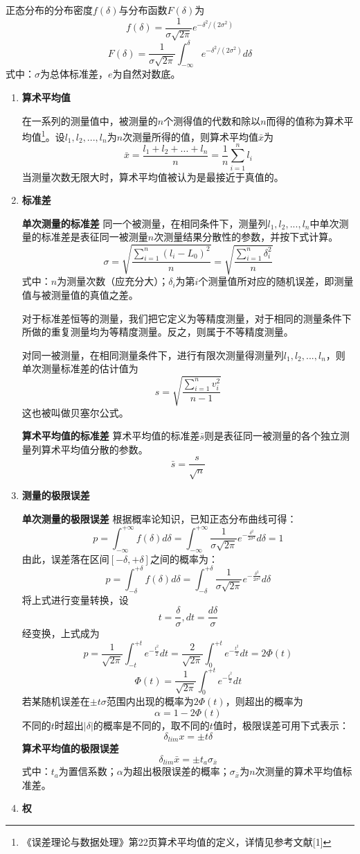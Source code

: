 正态分布的分布密度$ f(\delta) $与分布函数$ F(\delta) $为\[ f(\delta)=\frac{1}{\sigma\sqrt{2\pi}}e^{-\delta^2/(2\sigma^2)} \]\[ F(\delta)=\frac{1}{\sigma\sqrt{2\pi}}\int_{-\infty}^{\delta}e^{-\delta^2/(2\sigma^2)}d\delta \]
式中：$ \sigma $为总体标准差，$ e $为自然对数底。
\begin{enumerate}
	\item \textbf{算术平均值}
	
	\qquad 在一系列的测量值中，被测量的$ n $个测得值的代数和除以$ n $而得的值称为算术平均值\footnote{《误差理论与数据处理》第22页算术平均值的定义，详情见参考文献[1]}。设$ l_1,l_2,...,l_n $为$ n $次测量所得的值，则算术平均值$ \bar{x} $为\[ \bar{x}=\frac{l_1+l_2+...+l_n}{n}=\frac{1}{n}\sum_{i=1}^{n}l_i \]
	当测量次数无限大时，算术平均值被认为是最接近于真值的。
	\item \textbf{标准差}
	
	\textbf{单次测量的标准差 } 同一个被测量，在相同条件下，测量列$ l_1,l_2,...,l_n $中单次测量的标准差是表征同一被测量$ n $次测量结果分散性的参数，并按下式计算。
	\[ \sigma=\sqrt{\frac{\sum\limits_{i=1}^{n}(l_i-L_0)^2}{n}}=\sqrt{\frac{\sum\limits_{i=1}^{n}\delta_i^2}{n}} \]
	式中：$ n $为测量次数（应充分大）；$ \delta_i $为第$ i $个测量值所对应的随机误差，即测量值与被测量值的真值之差。
	
	\qquad 对于标准差恒等的测量，我们把它定义为等精度测量，对于相同的测量条件下所做的重复测量均为等精度测量。反之，则属于不等精度测量。
	
	\qquad 对同一被测量，在相同测量条件下，进行有限次测量得测量列$ l_1,l_2,...,l_n $，则单次测量标准差的估计值为\[ s=\sqrt{\frac{\sum\limits_{i=1}^{n}v_i^2}{n-1}} \]
	这也被叫做贝塞尔公式。
	
	\textbf{算术平均值的标准差 } 算术平均值的标准差$ \bar{s} $则是表征同一被测量的各个独立测量列算术平均值分散的参数。\[ \bar{s}=\frac{s}{\sqrt{n}} \]
	\item \textbf{测量的极限误差}
	
	\textbf{单次测量的极限误差 } 根据概率论知识，已知正态分布曲线可得：\[ p=\int_{-\infty}^{+\infty}f(\delta)d\delta=\int_{-\infty}^{+\infty}\frac{1}{\sigma\sqrt{2\pi}}e^{-\frac{\delta^2}{2\sigma^2}}d\delta=1 \]
	由此，误差落在区间$ [-\delta,+\delta] $之间的概率为：\[ p=\int_{-\delta}^{+\delta}f(\delta)d\delta=\int_{-\delta}^{+\delta}\frac{1}{\sigma\sqrt{2\pi}}e^{-\frac{\delta^2}{2\sigma^2}}d\delta \]
	将上式进行变量转换，设\[ t=\frac{\delta}{\sigma},dt=\frac{d\delta}{\sigma} \]
	经变换，上式成为\[ p=\frac{1}{\sqrt{2\pi}}\int_{-t}^{+t}e^{-\frac{t^2}{2}}dt=\frac{2}{\sqrt{2\pi}}\int_{0}^{+t}e^{-\frac{t^2}{2}}dt=2\Phi(t) \]
	\[ \Phi(t)=\frac{1}{\sqrt{2\pi}}\int_{0}^{+t}e^{-\frac{t^2}{2}}dt \]
	若某随机误差在$ \pm t\sigma $范围内出现的概率为$ 2\Phi(t) $，则超出的概率为\[ \alpha=1-2\Phi(t) \]
	不同的$ t $时超出$ |\delta| $的概率是不同的，取不同的$ t $值时，极限误差可用下式表示：\[ \delta_{lim}x=\pm t\delta \]
	\textbf{算术平均值的极限误差} \[ \delta_{lim}\bar{x}=\pm t_a\sigma_{\bar{x}} \]
	式中：$ t_a $为置信系数；$ \alpha $为超出极限误差的概率；$ \sigma_{\bar{x}} $为$ n $次测量的算术平均值标准差。
	\item \textbf{权}
	

\end{enumerate}
